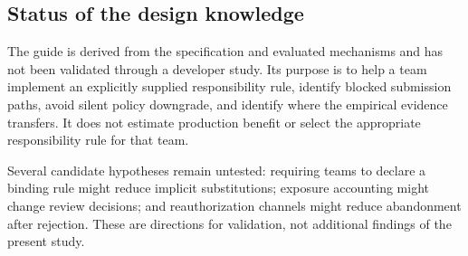 \subsection{Status of the design knowledge}
The guide is derived from the specification and evaluated mechanisms and has not been validated through a developer study. Its purpose is to help a team implement an explicitly supplied responsibility rule, identify blocked submission paths, avoid silent policy downgrade, and identify where the empirical evidence transfers. It does not estimate production benefit or select the appropriate responsibility rule for that team.

Several candidate hypotheses remain untested: requiring teams to declare a binding rule might reduce implicit substitutions; exposure accounting might change review decisions; and reauthorization channels might reduce abandonment after rejection. These are directions for validation, not additional findings of the present study.
